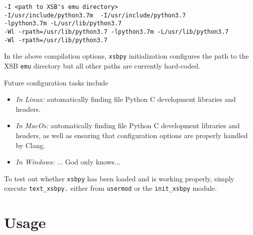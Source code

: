 \begin{verbatim}
-I <path to XSB's emu directory>  
-I/usr/include/python3.7m  -I/usr/include/python3.7  
-lpython3.7m -L/usr/lib/python3.7 
-Wl -rpath=/usr/lib/python3.7 -lpython3.7m -L/usr/lib/python3.7 
-Wl -rpath=/usr/lib/python3.7
\end{verbatim}

\noindent
In the above compilation options, {\tt xsbpy} initialization
configures the path to the XSB {\tt emu} directory but all other paths
are currently hard-coded.

Future configuration tasks include

\begin{itemize}
\item {\em In Linux:} automatically finding file Python C development
  libraries and headers.
\item {\em In MacOs:} automatically finding file Python C development
  libraries and headers, as well as ensuring that configuration
  options are properly handled by Clang.
\item {\em In Windows:} ... God only knows...
\end{itemize}

To test out whether {\tt xsbpy} has been loaded and is working
properly, simply execute {\tt text\_xsbpy.} either from {\tt usermod}
or the {\tt init\_xsbpy} module.

\section{Usage}


